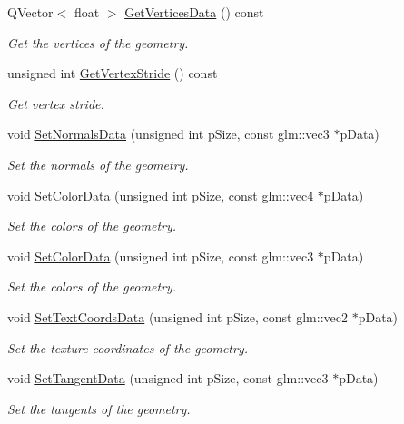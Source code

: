 \begin{DoxyCompactItemize}
Q\+Vector$<$ float $>$ \hyperlink{class_geometry_a3eae5aa25ece2784ca0459a4f739f621}{Get\+Vertices\+Data} () const 
\begin{DoxyCompactList}\small\item\em Get the vertices of the geometry. \end{DoxyCompactList}\item 
unsigned int \hyperlink{class_geometry_a29977b97425c42535812af00262f1f91}{Get\+Vertex\+Stride} () const 
\begin{DoxyCompactList}\small\item\em Get vertex stride. \end{DoxyCompactList}\item 
void \hyperlink{class_geometry_a9296489a2f4a2d3046fa2db525e0c55f}{Set\+Normals\+Data} (unsigned int p\+Size, const glm\+::vec3 $\ast$p\+Data)
\begin{DoxyCompactList}\small\item\em Set the normals of the geometry. \end{DoxyCompactList}\item 
void \hyperlink{class_geometry_ac385bde3dd066a37a19898d724bf480b}{Set\+Color\+Data} (unsigned int p\+Size, const glm\+::vec4 $\ast$p\+Data)
\begin{DoxyCompactList}\small\item\em Set the colors of the geometry. \end{DoxyCompactList}\item 
void \hyperlink{class_geometry_ad3cc79f68c9ad93562ae7ea6d7b3acc0}{Set\+Color\+Data} (unsigned int p\+Size, const glm\+::vec3 $\ast$p\+Data)
\begin{DoxyCompactList}\small\item\em Set the colors of the geometry. \end{DoxyCompactList}\item 
void \hyperlink{class_geometry_a50937473645f0beb329bf116da9f442a}{Set\+Text\+Coords\+Data} (unsigned int p\+Size, const glm\+::vec2 $\ast$p\+Data)
\begin{DoxyCompactList}\small\item\em Set the texture coordinates of the geometry. \end{DoxyCompactList}\item 
void \hyperlink{class_geometry_a053c07a201e1519808ccdece2718bd95}{Set\+Tangent\+Data} (unsigned int p\+Size, const glm\+::vec3 $\ast$p\+Data)
\begin{DoxyCompactList}\small\item\em Set the tangents of the geometry. \end{DoxyCompactList}\item 

\end{DoxyCompactItemize}
